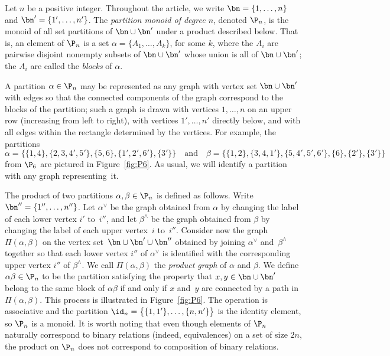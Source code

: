Let $n$ be a positive integer.  Throughout the article, we write
$\bn=\{1,\ldots,n\}$ and $\bn'=\{1',\ldots,n'\}$.  The \emph{partition monoid
of degree $n$}, denoted $\P_n$, is the monoid of all set partitions of
$\bn\cup\bn'$ under a product described below.  That is, an element of $\P_n$
is a set $\alpha=\{A_1,\ldots,A_k\}$, for some $k$, where the $A_i$ are pairwise
disjoint nonempty subsets of $\bn\cup\bn'$ whose union is all of $\bn\cup\bn'$;
the $A_i$ are called the \emph{blocks} of $\alpha$.

A partition $\alpha\in\P_n$ may be represented as any graph with vertex set
$\bn\cup\bn'$ with edges so that the connected components of the
graph correspond to the blocks of the partition; such a graph is drawn with
vertices $1,\ldots,n$ on an upper row (increasing from left to right), with
vertices $1',\ldots,n'$ directly below, and with all edges within the rectangle
determined by the vertices.   For example, the partitions
\[
\alpha = \big\{ \{1,4\},\{2,3,4',5'\},\{5,6\},\{1',2',6'\},\{3'\}\big\} \quad\text{and}\quad
\beta = \big\{ \{1,2\}, \{3,4,1'\}, \{5,4',5',6'\}, \{6\}, \{2'\}, \{3'\} \big\}
\]
from $\P_6$ are pictured in Figure~\ref{fig:P6}.  As usual, we will identify a
partition with any graph representing~it.

The product of two partitions $\alpha,\beta\in\P_n$ is defined as follows.  Write
$\bn''=\{1'',\ldots,n''\}$.  Let $\alpha^\vee$ be the graph obtained from $\alpha$ by
changing the label of each lower vertex $i'$ to~$i''$, and let $\beta^\wedge$ be
the graph obtained from $\beta$ by changing the label of each upper vertex~$i$
to~$i''$.  Consider now the graph $\Pi(\alpha,\beta)$ on the vertex set~$\bn\cup
\bn'\cup \bn''$ obtained by joining $\alpha^\vee$ and~$\beta^\wedge$ together so
that each lower vertex $i''$ of $\alpha^\vee$ is identified with the corresponding
upper vertex $i''$ of $\beta^\wedge$.  We call $\Pi(\alpha,\beta)$ the \emph{product
graph} of $\alpha$ and $\beta$.  We define $\alpha\beta\in\P_n$ to be the partition
satisfying the property that $x,y\in\bn\cup\bn'$ belong to the same block of
$\alpha\beta$ if and only if $x$ and~$y$ are connected by a path in $\Pi(\alpha,\beta)$.
This process is illustrated in Figure~\ref{fig:P6}.
%
The operation is associative and the partition
$\id_n=\big\{\{1,1'\},\ldots,\{n,n'\}\big\}$ is the identity element, so $\P_n$ is
a monoid.
%
It is worth noting that even though elements of $\P_n$ naturally correspond to binary relations (indeed, equivalences) on a set of size $2n$, the product on $\P_n$ does not correspond to composition of binary relations.


